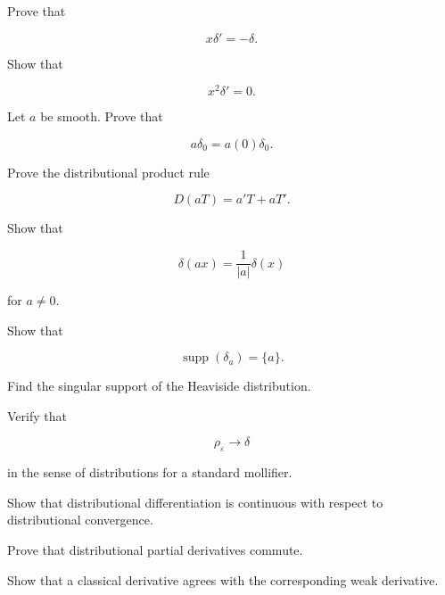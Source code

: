 \begin{exercise}[2]
Prove that

\[
x\delta'=-\delta.
\]
\end{exercise}

\begin{exercise}[2]
Show that

\[
x^2\delta'=0.
\]
\end{exercise}

\begin{exercise}[2]
Let \(a\) be smooth. Prove that

\[
a\delta_0
=
a(0)\delta_0.
\]
\end{exercise}

\begin{exercise}[2]
Prove the distributional product rule

\[
D(aT)=a'T+aT'.
\]
\end{exercise}

\begin{exercise}[2]
Show that

\[
\delta(ax)
=
\frac{1}{|a|}\delta(x)
\]

for \(a\neq0\).
\end{exercise}

\begin{exercise}[2]
Show that

\[
\operatorname{supp}(\delta_a)
=
\{a\}.
\]
\end{exercise}

\begin{exercise}[2]
Find the singular support of the Heaviside distribution.
\end{exercise}

\begin{exercise}[2]
Verify that

\[
\rho_\varepsilon\to\delta
\]

in the sense of distributions for a standard mollifier.
\end{exercise}

\begin{exercise}[2]
Show that distributional differentiation is continuous with respect to
distributional convergence.
\end{exercise}

\begin{exercise}[2]
Prove that distributional partial derivatives commute.
\end{exercise}

\begin{exercise}[2]
Show that a classical derivative agrees with the corresponding weak
derivative.
\end{exercise}

